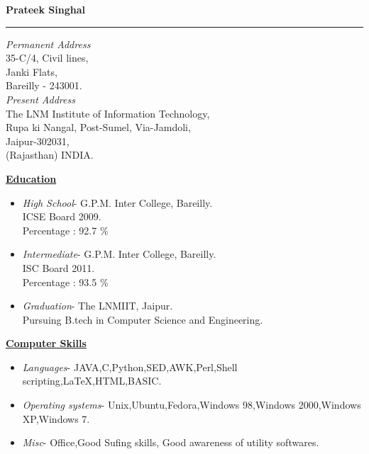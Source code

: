 \documentclass{article}
\begin{document}
\begin{center}\Huge{\bf Prateek Singhal}\end{center}
\rule{\textwidth}{1pt}
\large
\vspace{.1in}
\emph{Permanent Address}\\
35-C/4, Civil lines,\\
Janki Flats, \\
Bareilly - 243001.\vspace{.1in}\\
\emph{Present Address}\vspace{.1in}\\
The LNM Institute of Information Technology,\\
Rupa ki Nangal, Post-Sumel, Via-Jamdoli,\\
Jaipur-302031,\\
(Rajasthan) INDIA.\\
\begin{center}\Large{\bf \underline{Education}}\end{center}\vspace{.1in}
\begin{itemize}
\item \emph{High School}- G.P.M. Inter College, Bareilly.\\ 
         ICSE Board 2009.\\
         Percentage : 92.7 \%\\
\item \emph{Intermediate}- G.P.M. Inter College, Bareilly.\\
	ISC Board 2011.\\
	Percentage : 93.5 \%\\
\item \emph{Graduation}- The LNMIIT, Jaipur.\\
	Pursuing B.tech in Computer Science and Engineering.\\
\end{itemize}
\vspace{.1in}
\begin{center}\Large{\bf \underline{Computer Skills}}\end{center}\vspace{.1in}
\begin{itemize}
\item \emph{Languages}- JAVA,C,Python,SED,AWK,Perl,Shell scripting,\LaTeX,HTML,BASIC.
\item \emph{Operating systems}- Unix,Ubuntu,Fedora,Windows 98,Windows 2000,Windows XP,Windows 7.
\item \emph{Misc}- Office,Good Sufing skills, Good awareness of utility softwares.
\end{itemize}
\end{document}
